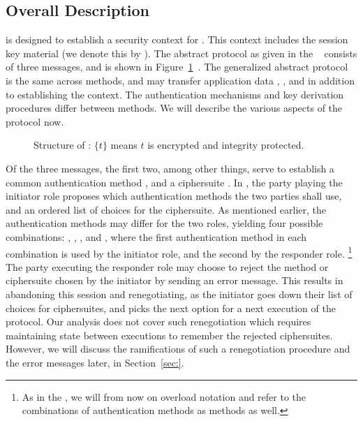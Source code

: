 \subsection{Overall Description}
\label{sec:description}
\mEdhoc{} is designed to establish a security context for \mOscore{}.
%
This context includes the session key material (we denote this by \mSessKey{}).
%
The abstract protocol as given in the \mSpec{}~\cite{} consists of three
messages, and is shown in Figure~\ref{fig:edhocFramework}~\cite{Norr21}.
%
The generalized abstract protocol is the same across methods,
and may transfer application data \mADone{}, \mADtwo{}, and \mADthree{} in
addition to establishing the context.
%
The authentication mechanisms and key derivation procedures differ between
methods.
%
We will describe the various aspects of the protocol now.
%
\begin{figure}[ht]
\centering
{}
    \caption{Structure of \mEdhoc{}: $\{t\}$ means $t$ is encrypted and integrity
protected.~\cite{Norr21}}
\label{fig:edhocFramework}
\end{figure}
%
Of the three messages, the first two, among other things, serve to establish a
common authentication method \mMethod{}, and a ciphersuite \mSuites{}.
%
In \mMethod{}, the party playing the initiator role proposes which
authentication methods the two parties shall use, and an ordered list
of choices for the ciphersuite.
%
As mentioned earlier, the authentication methods may differ for the two roles,
yielding four possible
combinations: \mSigSig{}, \mSigStat{}, \mStatSig{}, and \mStatStat{},
where the first authentication method in each combination is used by the
initiator role, and the second by the responder role.
\footnote{As in the \mSpec{}, we will from now on overload
notation and refer to the combinations of authentication methods as methods as
well.}
%
The party executing the responder role may choose to reject the method or
ciphersuite chosen by the initiator by sending an error message.
%
This results in abandoning this session and renegotiating, as the initiator
goes down their list of choices for ciphersuites, and picks the next option for
a next execution of the protocol.
%
Our analysis does not cover such renegotiation which requires maintaining state
between executions to remember the rejected ciphersuites.
%
However, we will discuss the ramifications of such a renegotiation procedure
and the error messages later, in Section~\ref{sec:}.
%

